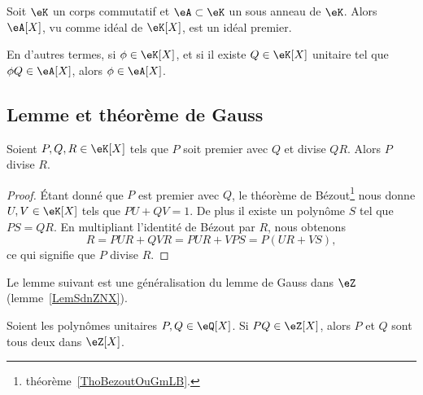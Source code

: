 \begin{lemma}   \label{LemzwkYdn}
	Soit \( \eK\) un corps commutatif et \( \eA\subset \eK\) un sous
	anneau de \( \eK\).  Alors \( \eA[X] \), vu comme idéal de \( \eK[X]
	\), est un idéal premier.

	En d'autres termes, si \( \phi\in \eK[X]\), et si il existe \( Q\in \eK[X]\) unitaire tel que \( \phi Q\in \eA[X]\), alors \( \phi\in \eA[X]\).
\end{lemma}

\subsection{Lemme et théorème de Gauss}

\begin{theorem}  \label{ThoLLgIsig}
	Soient \( P,Q,R\in \eK[X]\) tels que \( P\) soit premier avec \( Q\) et divise \( QR\). Alors \( P\) divise \( R\).
\end{theorem}

\begin{proof}
	Étant donné que \( P\) est premier avec \( Q\), le théorème de Bézout\footnote{théorème~\ref{ThoBezoutOuGmLB}.} nous donne \( U,V\in \eK[X]\) tels que \( PU+QV=1\). De plus il existe un polynôme \( S\) tel que \( PS=QR\). En multipliant l'identité de Bézout par \( R\), nous obtenons
	\begin{equation}
		R=PUR+QVR=PUR+VPS=P(UR+VS),
	\end{equation}
	ce qui signifie que \( P\) divise \( R\).
\end{proof}

Le lemme suivant est une généralisation du lemme de Gauss dans \( \eZ\) (lemme~\ref{LemSdnZNX}).
\begin{lemma}       \label{LemEfdkZw}   
	Soient les polynômes unitaires \( P,Q\in \eQ[X]\). Si \( PQ\in\eZ[X]\), alors \( P\) et \( Q\) sont tous deux dans \( \eZ[X]\).
\end{lemma}

